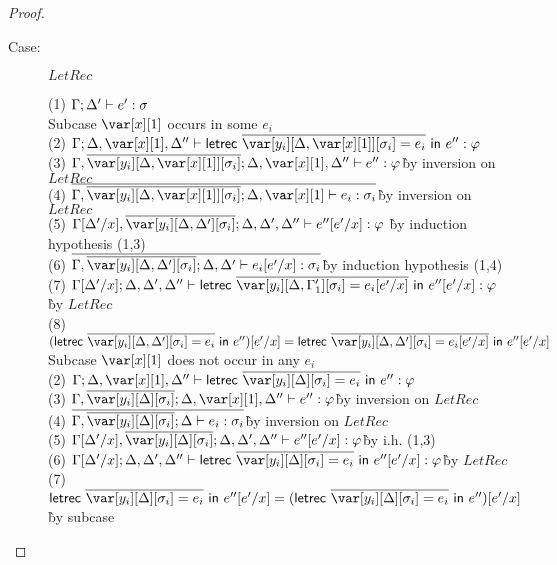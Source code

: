 \begin{proof}
\begin{description}
\item[Case:] $LetRec$
\begin{tabbing}
  (1) $\Gamma; \Delta' \vdash e' : \sigma$\\
  Subcase $\xl$ occurs in some $e_i$\\
  (2) $\G; \D, \xl, \D'' \vdash \lletrec{\ov{\var[y_i][\D,\xl][\s_i] = e_i}}{e''} : \vp$\\
  (3) $\G, \ov{\var[y_i][\D,\xl][\s_i]}; \D, \xl, \D'' \vdash e'' : \vp$\` by inversion on $LetRec$\\
  (4) $\ov{\G,\ov{\var[y_i][\D, \xl][\s_i]}; \D, \xl \vdash e_i : \s_i}$\` by inversion on $LetRec$\\
  (5) $\G[\D'/x], \ov{\var[y_i][\D, \D'][\s_i]}; \D, \D', \D'' \vdash e''[e'/x] : \vp$ \` by induction hypothesis (1,3)\\
  (6) $\ov{\G, \ov{\var[y_i][\D, \D'][\s_i]}; \D, \D' \vdash e_i[e'/x] : \s_i}$\` by induction hypothesis (1,4)\\
  (7) $\G[\D'/x]; \D, \D', \D'' \vdash \lletrec{\ov{\var[y_i][\D,\G'_1][\s_i] = e_i[e'/x]}}{e''[e'/x]} : \vp$\` by $LetRec$\\
  (8) $(\lletrec{\ov{\var[y_i][\D,\D'][\s_i] = e_i}}{e''})[e'/x] = \lletrec{\ov{\var[y_i][\D,\D'][\s_i] = e_i[e'/x]}}{e''[e'/x]}$\\
  Subcase $\xl$ does not occur in any $e_i$\\
  (2) $\G; \D, \xl, \D'' \vdash \lletrec{\ov{\var[y_i][\D][\s_i] = e_i}}{e''} : \vp$\\
  (3) $\G, \ov{\var[y_i][\D][\s_i]}; \D, \xl, \D'' \vdash e'' : \vp$\` by inversion on $LetRec$\\
  (4) $\ov{\G, \ov{\var[y_i][\D][\s_i]}; \D \vdash e_i : \s_i}$\` by inversion on $LetRec$\\
  (5) $\G[\D'/x], \ov{\var[y_i][\D][\s_i]}; \D, \D', \D'' \vdash e''[e'/x] : \vp$\` by i.h. (1,3)\\
  (6) $\G[\D'/x]; \D, \D', \D'' \vdash \lletrec{\ov{\var[y_i][\D][\s_i] = e_i}}{e''[e'/x]} : \vp$\` by $LetRec$\\
  (7) $\lletrec{\ov{\var[y_i][\D][\s_i] = e_i}}{e''[e'/x]} = (\lletrec{\ov{\var[y_i][\D][\s_i] = e_i}}{e''})[e'/x]$\` by subcase\\
\end{tabbing}


\end{description}
\end{proof}
